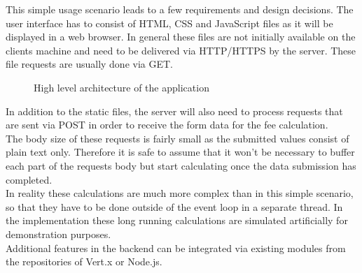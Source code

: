 
This simple usage scenario leads to a few requirements and
design decisions.
The user interface has to consist of HTML, CSS and JavaScript files as it 
will be displayed in a web browser. In general these files are not initially
available on the clients machine and need to be delivered via HTTP/HTTPS by the
server. These file requests are usually done via GET.\\

\begin{figure}[h]
	\centering
	\setlength\fboxsep{2pt}
	\caption{High level architecture of the application}
	\label{fig:high_level_architecture}
\end{figure}

In addition to the static files, the server will also need to process
requests that are sent via POST in order to receive the form data for the
fee calculation.\\
The body size of these requests is fairly small as the submitted values consist
of plain text only. Therefore it is safe to assume that it won't be necessary to
buffer each part of the requests body but start calculating once the data
submission has completed.\\
In reality these calculations are much more complex than in this simple scenario,
so that they have to be done outside of the event loop in a separate thread.
In the implementation these long running calculations are simulated artificially for
demonstration purposes.\\
Additional features in the backend can be integrated via existing modules from
the repositories of Vert.x or Node.js.

